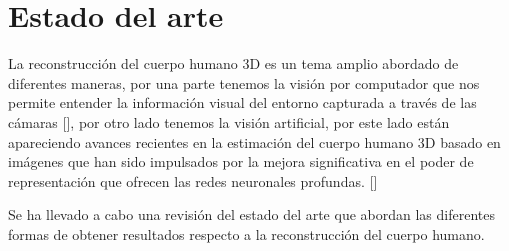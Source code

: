 \newpage


\section{Estado del arte}
La reconstrucción del cuerpo humano 3D es un tema amplio abordado de diferentes maneras, por una parte tenemos la visión por computador que nos permite entender la información visual del entorno capturada a través de las cámaras [\cite{Zhang1}], por otro lado tenemos la visión artificial, por este lado están apareciendo avances recientes en la estimación del cuerpo humano 3D basado en imágenes que han sido impulsados por la mejora significativa en el poder de representación que ofrecen las redes neuronales profundas. [\cite{pifuhd}]

Se ha llevado a cabo una revisión del estado del arte que abordan las diferentes formas de obtener resultados respecto a la reconstrucción del cuerpo humano.
\\

